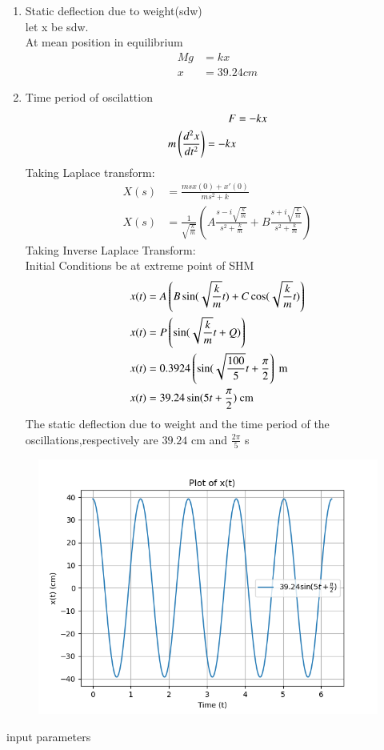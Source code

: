 \documentclass[journal,12pt,twocolumn]{IEEEtran}
\theoremstyle{remark}
\begin{document}
\begin{enumerate}
    \item Static deflection due to weight(sdw)\\
    let x be sdw.\\
    At mean position in equilibrium\\
    \begin{align}
        Mg&=kx\\
        x&=39.24cm
    \end{align}
     \item Time period of oscilattion\\
     
     \begin{align}
           F&=-kx\\
           m\left(\frac{d^2x}{dt^2}\right)=-kx
     \end{align}
     Taking Laplace transform:
     \begin{align}
      X(s) &= \frac{ms x(0) + x'(0)}{ms^2 + k} \\
       X(s) &= \frac{1}{\sqrt{\frac{k}{m}}} \left( A \frac{s - i \sqrt{\frac{k}{m}}}{s^2 + \frac{k}{m}} + B \frac{s + i \sqrt{\frac{k}{m}}}{s^2 + \frac{k}{m}} \right) 
     \end{align}
     Taking Inverse Laplace Transform:\\
     Initial Conditions be at extreme point of SHM
     \begin{align}
      x(t) &=A \left( B \sin(\sqrt{\frac{k}{m}}t) + C\cos(\sqrt{\frac{k}{m}}t) \right)\\
       x(t) &=P \left(\sin(\sqrt{\frac{k}{m}}t+Q) \right)\\
      x(t)&=0.3924\left(\sin(\sqrt{\frac{100}{5}}t+\frac{\pi}{2}\right)\text{ m}\\
      x(t)&=39.24 \sin(5t+\frac{\pi}{2}) \text{ cm}
     \end{align}
    The static deflection due to weight and the time period of the oscillations,respectively are $39.24$ cm and $\frac{2\pi}{5}$ s
\end{enumerate}
 \begin{figure}[h!]
    \centering
    \includegraphics[width = \columnwidth]{figs/xe_71_f2.png}
\end{figure}
 \begin{table}[!ht]
    \centering
        
    \caption{input parameters}
\end{table}
\end{document}
